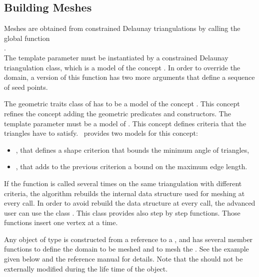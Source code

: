 \subsection{Building Meshes\label{sec:Mesh_2_building_meshes}}

Meshes are obtained from
constrained Delaunay triangulations by calling the global function \\
. \\
The template parameter  must be instantiated by a constrained
Delaunay triangulation class, which is a model of the concept
. In order to override the domain,
a version of this function has two more arguments that define a sequence of
seed points.

The geometric traits class of  has to be a
model of the concept .  This concept
refines the concept 
adding the geometric predicates and constructors. The template parameter
 must be a model of . This concept
defines criteria that the triangles have to satisfy.
\cgal\ provides two models for this concept:
\begin{itemize}
\item {}, that defines a shape criterion
  that bounds the minimum angle of triangles, 
\item {}, that adds to the previous
criterion a bound on the maximum edge length.
\end{itemize}

If the function  is called several times on the
same triangulation with different criteria, the algorithm rebuilds the 
internal data structure used for meshing at every call. In order to avoid 
rebuild the data structure at every call, the advanced user can
use the class . This class provides also step
by step functions. Those functions insert one vertex at a time.

Any object of type  is constructed from a
reference to a , and has several member functions to define the
domain to be meshed and to mesh the . See the example given below
and the reference manual for details. Note that the  should not be
externally modified during the life time of the 
object.

